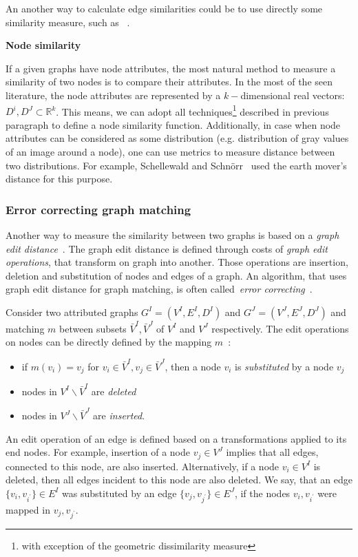 An another way to calculate edge similarities could be to use directly some similarity measure, such as ~.

\textbf{Node similarity}

If a given graphs have node attributes, the most natural method to measure a similarity of two nodes is to compare their attributes. In the most of the seen literature, the node attributes are represented by a $k-$dimensional real vectors: $D^i,D^J\subset\mathbb{R}^k$. This means, we can adopt all techniques\footnote{with exception of the geometric dissimilarity measure} described in previous paragraph to define a node similarity function. Additionally, in case when node attributes can be considered as some distribution (e.g. distribution of gray values of an image around a node), one can use metrics to measure distance between two distributions. For example, Schellewald and Schn\"orr~\cite{Schellewald2005} used the earth mover's distance for this purpose.
\subsubsection{Error correcting graph matching}
Another way to measure the similarity between two graphs is based on a \emph{graph edit distance}~\cite{Bunke1983_inexactGM}. The graph edit distance is defined through costs of \emph{graph edit operations}, that transform on graph into another. Those operations are insertion, deletion and substitution of nodes and edges of a graph. An algorithm, that uses graph edit distance for graph matching, is often called~\emph{error correcting}~\cite{Conte2004}.

Consider two attributed graphs $G^I = (V^I, E^I,D^I)$ and $G^J = (V^J, E^J,D^J)$ and matching $m$ between subsets $\bar{V}^I,\bar{V}^J$ of $V^I$ and $V^J$ respectively. The edit operations on nodes can be directly defined by the mapping $m$~\cite{Bunke1998_ErrTolerantGM}:
\begin{itemize}
	\item if $m(v_i)=v_j$ for $v_i\in\bar{V}^I,v_j\in\bar{V}^J$, then a node $v_i$ is \emph{substituted} by a node $v_j$
	\item nodes in $V^I\backslash\bar{V}^I$ are \emph{deleted}
	\item nodes in $V^J\backslash\bar{V}^J$ are \emph{inserted}.
\end{itemize}
An edit operation of an edge is defined based on a transformations applied to its end nodes. For example, insertion of a node $v_j\in V^J$ implies that all edges, connected to this node, are also inserted. Alternatively, if a node $v_i\in V^I$ is deleted, then all edges incident to this node are also deleted. We say, that an edge $\{v_i,v_{i^\prime}\}\in E^I$ was substituted by an edge $\{v_j,v_{j^\prime}\}\in E^J$, if the nodes $v_i,v_{i^\prime}$ were mapped in $v_j,v_{j^\prime}$.


